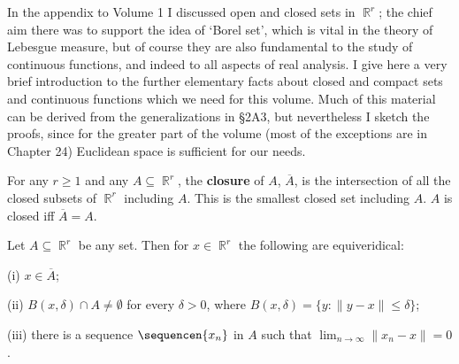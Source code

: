  
\def\chaptername{Appendix} 
\def\sectionname{The topology of Euclidean space} 
 
 
In the appendix to Volume 1 I 
discussed open and closed sets in $\BbbR^r$;  the 
chief aim there was to support the idea of `Borel set', which is 
vital in the theory of Lebesgue measure, but of course they are also 
fundamental to the study of continuous functions, and indeed to all 
aspects of real analysis. 
I give here a very brief introduction to the further elementary facts 
about closed and compact sets and continuous functions which we need for 
this volume.   Much of this material can be derived from the 
generalizations in \S2A3, but nevertheless I sketch the proofs, since 
for the greater 
part of the volume (most of the exceptions are in Chapter 24) Euclidean 
space is sufficient for our needs. 
 
 For any $r\ge 1$ and any 
$A\subseteq\BbbR^r$, the {\bf closure} of $A$, $\overline{A}$, is the 
intersection of all the closed subsets of $\BbbR^r$ including $A$. 
This is the smallest closed set 
including $A$.   $A$ is closed iff $\overline{A}=A$. 
 
 Let $A\subseteq\BbbR^r$ be any set.   Then for 
$x\in\BbbR^r$ the following are equiveridical: 
 
(i) $x\in\overline{A}$; 
 
(ii) $B(x,\delta)\cap A\ne\emptyset$ for every $\delta>0$, where 
$B(x,\delta)=\{y:\|y-x\|\le\delta\}$; 
 
(iii) there is a sequence $\sequencen{x_n}$ in $A$ such that 
$\lim_{n\to\infty}\|x_n-x\|=0$. 
 
